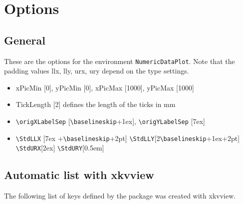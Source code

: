 %
%
%
%

\section{Options}

\subsection{General}\label{sec:OptionsGeneral}
	
	These are the options for the environment \texttt{NumericDataPlot}. Note that the padding values llx, lly, urx, ury depend on the type settings.
	
	\begin{itemize}
	  \item xPicMin [0], yPicMin [0], xPicMax [1000], yPicMax [1000]
	  \item TickLength [2] defines the length of the ticks in mm
\item \verb|\origXLabelSep| [\verb|\baselineskip|+1ex], \verb|\origYLabelSep|
[7ex]
	  \item \verb|\StdLLX| [7ex +\verb|\baselineskip|+2pt]
		\verb|\StdLLY|[2\verb|\baselineskip|+1ex+2pt]
		\verb|\StdURX|[2ex]
		\verb|\StdURY|[0.5em]
	\end{itemize}
	
	
\subsection{Automatic list with xkvview}
The following list of keys defined by the package was created with xkvview.



